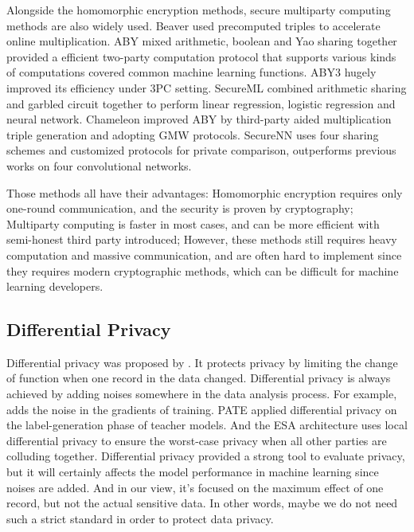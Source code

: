 Alongside the homomorphic encryption methods, secure multiparty computing methods are also widely used. Beaver\cite{beaver1991} used precomputed triples to accelerate online multiplication. 
ABY\cite{demmler2015aby} mixed arithmetic, boolean and Yao sharing together provided a efficient two-party computation protocol that supports various kinds of computations covered common machine learning functions. ABY3\cite{mohassel2018aby3} hugely improved its efficiency under 3PC setting. 
\newline
SecureML\cite{mohassel2017secureml} combined arithmetic sharing and garbled circuit together to perform linear regression, logistic regression and neural network. Chameleon\cite{riazi2018chameleon} improved ABY by third-party aided multiplication triple generation and adopting GMW protocols\cite{GMW1987}. SecureNN\cite{wagh2019securenn} uses four sharing schemes and customized protocols for private comparison, outperforms previous works on four convolutional networks.

Those methods all have their advantages: Homomorphic encryption requires only one-round communication, and the security is proven by cryptography; Multiparty computing is faster in most cases, and can be more efficient with semi-honest third party introduced; However, these methods still requires heavy computation and massive communication, and are often hard to implement since they requires modern cryptographic methods, which can be difficult for machine learning developers.

\subsection{Differential Privacy}
Differential privacy was proposed by \cite{dwork2014dp}. It protects privacy by limiting the change of function when one record in the data changed. Differential privacy is always achieved by adding noises somewhere in the data analysis process. For example, \cite{abadi2016deepdp} adds the noise in the gradients of training. PATE\cite{nicolas2017pate} applied differential privacy on the label-generation phase of teacher models. And the ESA architecture\cite{Bittau2017ESA} uses local differential privacy to ensure the worst-case privacy when all other parties are colluding together.
Differential privacy provided a strong tool to evaluate privacy, but it will certainly affects the model performance in machine learning since noises are added. And in our view, it's focused on the maximum effect of one record, but not the actual sensitive data. In other words, maybe we do not need such a strict standard in order to protect data privacy. 

